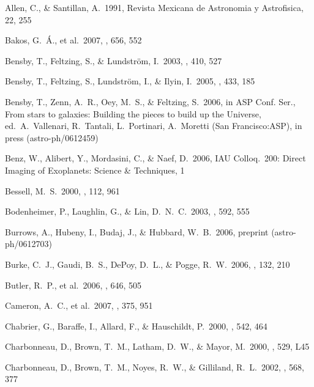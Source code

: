 \documentclass{emulateapj}
\begin{document}
\begin{thebibliography}

 Allen, C., \& 
Santillan, A.\ 1991, Revista Mexicana de Astronomia y Astrofisica, 22, 255 

 Bakos, G.~{\'A}., et al.\ 
2007, \apj, 656, 552 

 Bensby, T., Feltzing, 
S., \& Lundstr{\"o}m, I.\ 2003, \aap, 410, 527 

 Bensby, T., Feltzing, 
S., Lundstr{\"o}m, I., \& Ilyin, I.\ 2005, \aap, 433, 185 

 Bensby, T., Zenn, A.~R., 
Oey, M.~S., \& Feltzing, S.\ 2006, in ASP Conf. Ser., From stars to galaxies: Building the pieces to build up the Universe, ed.\ A.\ Vallenari, R.\ Tantali, L.\ Portinari, A.\ Moretti (San Francisco:ASP), in press (astro-ph/0612459)

 Benz, W., Alibert, Y., 
Mordasini, C., \& Naef, D.\ 2006, IAU Colloq.~200: Direct Imaging of 
Exoplanets: Science \& Techniques, 1 

 Bessell, M.~S.\ 2000, \pasp, 
112, 961 

 Bodenheimer, P., 
Laughlin, G., \& Lin, D.~N.~C.\ 2003, \apj, 592, 555 

 Burrows, A., Hubeny, 
I., Budaj, J., \& Hubbard, W.~B.\ 2006, preprint (astro-ph/0612703) 

 Burke, C.~J., Gaudi, 
B.~S., DePoy, D.~L., \& Pogge, R.~W.\ 2006, \aj, 132, 210 

 Butler, R.~P., et al.\ 
2006, \apj, 646, 505 

 Cameron, A.~C., et al.\ 
2007, \mnras, 375, 951 

\bibitem[Chabrier et al.(2000)]{CHAB00} Chabrier, G., Baraffe, 
I., Allard, F., \& Hauschildt, P.\ 2000, \apj, 542, 464 

\bibitem[Charbonneau et al.(2000)]{CHA00} Charbonneau, D., 
Brown, T.~M., Latham, D.~W., \& Mayor, M.\ 2000, \apjl, 529, L45 

\bibitem[Charbonneau et al.(2002)]{CHA02} Charbonneau, D., 
Brown, T.~M., Noyes, R.~W., \& Gilliland, R.~L.\ 2002, \apj, 568, 377 


\end{thebibliography}
\end{document}
